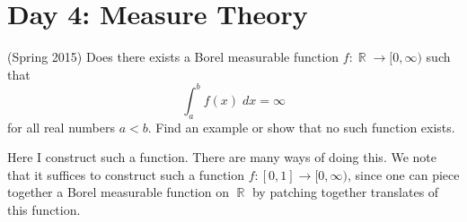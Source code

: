 \documentclass[answers]{exam}
\DeclareMathOperator{\RR}{\mathbb{R}}
\theoremstyle{problemstyle}
\newcommand{\norm}[1]{\left\lVert#1\right\rVert} %
\newcommand{\1}[1]{\textbf{1}_{\left[#1\right]}} %
\def\R{\mathbb{R}} %
\begin{document}
\begin{questions}
\begin{solution}
\begin{comment}
  Let $\epsilon>0$. Since $E$ is measurable and $|E|<\infty$, $\chi_{E}$ is integrable. Since $C_{c}(\R)$ is dense in $L^{1}(\R)$, there exists $g\in C_{c}(\R)$ such that $\norm{g-\chi_{E}}_{L^{1}(\R)}<\epsilon/3$. Since $g$ is continuous and compactly supported, it is unformly continuous. Therefore (again using the fact that $|E|<\infty$) we may choose $\delta>0$ such
  \begin{equation}
    |g(x)-g(y)|< \frac{\epsilon}{3|E|}\label{eq:uniform-continuity}
  \end{equation}
  whenever $|x-y|<\delta$.
Let $r,s\in \R$ such that $|s-r|<\delta$. Writing $f(r)= \int_{\R}\chi_{E}(x)\chi_{E}(x-r)dx$, we have
\begin{align*}
  f(r)-f(s) & = \int_{\R}\chi_{E}(x)\left[\chi_{E}(x-r)-\chi_{E}(x-s)\right]dx\\
            & = \int_{\R}\chi_{E}(x)\left[\chi_{E}(x-r)-g(x-r)+g(x-r)-g(x-s)+g(x-s)-\chi_{E}(x-s)\right]dx.
\end{align*}
Therefore by the triangle inequality,
\begin{align*}
  |f(r)-f(s)| &\leq \int_{\R}\chi_{E}(x)|\chi_{E}(x-r)-g(x-r)|dx + \int_{\R}\chi_{E}(x)|g(x-r)-g(x-s)|dx \\ 
  &\quad +\int_{\R}\chi_{E}|g(x-s)-\chi_{E}(x-s)|dx.\\
              &\leq \int_{\R}|\chi_{E}(x-r)-g(x-r)|dx + \int_{E}|g(x-r)-g(x-s)|dx \\\quad &+\int_{\R}|g(x-s)-\chi_{E}(x-s)|dx.
\end{align*}
By translation invariance (i.e. do a u-substitution), the first and third integrals both equal  $\int_{\R}|\chi_{E}(x)-g(x)|dx < \epsilon/3$. By \eqref{eq:uniform-continuity}, the second integral is less than $\epsilon/3$. Therefore $|f(r)-f(s)|<\epsilon$. We have shown that $\delta$ responds to the $\epsilon$-challenge in the definition of continuity. Therefore $f$ is continuous.
\end{comment}
\end{solution}

\newpage
\section{Day 4: Measure Theory}


\question (Spring 2015) Does there exists a Borel measurable function $f: \RR \to [0,\infty)$ such that
%
\[ \int_a^b f(x)\; dx = \infty \]
%
for all real numbers $a < b$. Find an example or show that no such function exists.
\begin{solution}
    Here I construct such a function. There are many ways of doing this. We note that it suffices to construct such a function $f: [0,1] \to [0,\infty)$, since one can piece together a Borel measurable function on $\RR$ by patching together translates of this function.
    

\end{solution}
\end{questions}
\end{document}
